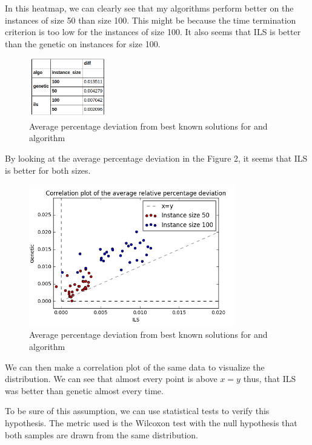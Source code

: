 \documentclass[a4paper]{article}
\begin{document}
In this heatmap, we can clearly see that my algorithms perform better on the instances of size 50 than size 100. This might be because the time termination criterion is too low for the instances of size 100. It also seems that ILS is better than the genetic on instances for size 100.

        \begin{figure}[H]
            \centering
            \label{dev}
            \includegraphics[width=0.3\textwidth]{dev.png}
            \caption{Average percentage deviation from best known solutions for and algorithm}
        \end{figure}

By looking at the average percentage deviation in the Figure 2, it seems that ILS is better for both sizes.

        \begin{figure}[H]
            \centering
            \label{corr}
            \includegraphics[width=0.8\textwidth]{corr.png}
            \caption{Average percentage deviation from best known solutions for and algorithm}
        \end{figure}

We can then make a correlation plot of the same data to visualize the distribution. We can see that almost every point is above $x=y$ thus, that ILS was better than genetic almost every time.

To be sure of this assumption, we can use statistical tests to verify this hypothesis. The metric used is the Wilcoxon test with the null hypothesis that both samples are drawn from the same distribution.
\end{document}
